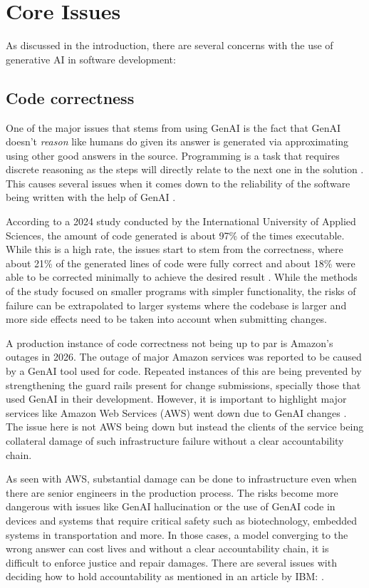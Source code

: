 \section{Core Issues}
As discussed in the introduction, there are several concerns with the use of generative AI in software development:

\subsection{Code correctness}
One of the major issues that stems from using GenAI is the fact that GenAI doesn't \textit{reason} like humans do given its answer is generated via approximating using other good answers in the source. Programming is a task that requires discrete reasoning as the steps will directly relate to the next one in the solution \cite{reasoning-ai}. This causes several issues when it comes down to the reliability of the software being written with the help of GenAI \cite{code-correctness}.

According to a 2024 study conducted by the International University of Applied Sciences, the amount of code generated is about 97\% of the times executable. While this is a high rate, the issues start to stem from the correctness, where about 21\% of the generated lines of code were fully correct and about 18\% were able to be corrected minimally to achieve the desired result \cite{code-correctness}. While the methods of the study focused on smaller programs with simpler functionality, the risks of failure can be extrapolated to larger systems where the codebase is larger and more side effects need to be taken into account when submitting changes.

A production instance of code correctness not being up to par is Amazon's outages in 2026. The outage of major Amazon services was reported to be caused by a GenAI tool used for code. Repeated instances of this are being prevented by strengthening the guard rails present for change submissions, specially those that used GenAI in their development. However, it is important to highlight major services like Amazon Web Services (AWS) went down due to GenAI changes \cite{amazon-ai-guard-rails}. The issue here is not AWS being down but instead the clients of the service being collateral damage of such infrastructure failure without a clear accountability chain.

As seen with AWS, substantial damage can be done to infrastructure even when there are senior engineers in the production process. The risks become more dangerous with issues like GenAI hallucination \cite{hallucinations-ibm} or the use of GenAI code in devices and systems that require critical safety such as biotechnology, embedded systems in transportation and more. In those cases, a model converging to the wrong answer can cost lives and without a clear accountability chain, it is difficult to enforce justice and repair damages. There are several issues with deciding how to hold accountability as mentioned in an article by IBM:  \cite{ibm-accountability}.

